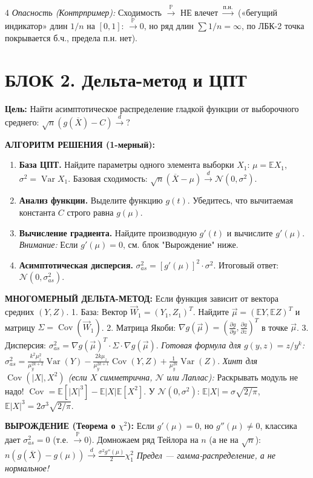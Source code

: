 \documentclass[a4paper, landscape]{article}
\newcommand{\E}{\mathbb{E}}
\renewcommand{\P}{\mathbb{P}}
\newcommand{\N}{\mathcal{N}}
\DeclareMathOperator{\Var}{Var}
\DeclareMathOperator{\Cov}{Cov}
\begin{document}
\begin{multicols*}{4}
\textit{Опасность (Контрпример):} Сходимость $\xrightarrow{\P}$ НЕ влечет $\xrightarrow{п.н.}$ («бегущий индикатор» длин $1/n$ на $[0,1]$: $\xrightarrow{\P} 0$, но ряд длин $\sum 1/n = \infty$, по ЛБК-2 точка покрывается б.ч., предела п.н. нет).

\section*{БЛОК 2. Дельта-метод и ЦПТ}
\textbf{Цель:} Найти асимптотическое распределение гладкой функции от выборочного среднего: $\sqrt{n}(g(\overline{X}) - C) \xrightarrow{d} ?$

\textbf{АЛГОРИТМ РЕШЕНИЯ (1-мерный):}
\begin{enumerate}[label=\textbf{Шаг \arabic*.}, leftmargin=*]
    \item \textbf{База ЦПТ.} Найдите параметры одного элемента выборки $X_1$: $\mu = \E X_1$, $\sigma^2 = \Var X_1$.
    Базовая сходимость: $\sqrt{n}(\overline{X} - \mu) \xrightarrow{d} \N(0, \sigma^2)$.
    \item \textbf{Анализ функции.} Выделите функцию $g(t)$. Убедитесь, что вычитаемая константа $C$ строго равна $g(\mu)$.
    \item \textbf{Вычисление градиента.} Найдите производную $g'(t)$ и вычислите $g'(\mu)$. 
    \textit{Внимание:} Если $g'(\mu) = 0$, см. блок "Вырождение" ниже.
    \item \textbf{Асимптотическая дисперсия.} $\sigma_{as}^2 = [g'(\mu)]^2 \cdot \sigma^2$. Итоговый ответ: $\N(0, \sigma_{as}^2)$.
\end{enumerate}

\textbf{МНОГОМЕРНЫЙ ДЕЛЬТА-МЕТОД:}
Если функция зависит от вектора средних $(Y, Z)$.
1. База: Вектор $\vec{W}_1 = (Y_1, Z_1)^T$. Найдите $\vec{\mu} = (\E Y, \E Z)^T$ и матрицу $\Sigma = \Cov(\vec{W}_1)$.
2. Матрица Якоби: $\nabla g(\vec{\mu}) = (\frac{\partial g}{\partial y}, \frac{\partial g}{\partial z})^T$ в точке $\vec{\mu}$.
3. Дисперсия: $\sigma_{as}^2 = \nabla g(\vec{\mu})^T \cdot \Sigma \cdot \nabla g(\vec{\mu})$.
\textit{Готовая формула для $g(y,z) = z/y^k$:} 
$\sigma^2_{as} \!=\! \frac{k^2 \mu_z^2}{\mu_y^{2k+2}} \Var(Y) - \frac{2k \mu_z}{\mu_y^{2k+1}} \Cov(Y, Z) + \frac{1}{\mu_y^{2k}} \Var(Z)$.
\textit{Хинт для $\Cov(|X|, X^2)$ (если $X$ симметрична, $\N$ или Лаплас):} Раскрывать модуль не надо! $\Cov = \E[|X|^3] - \E|X|\E[X^2]$. У $\N(0,\sigma^2)$: $\E|X|=\sigma\sqrt{2/\pi}$, $\E|X|^3=2\sigma^3\sqrt{2/\pi}$.

\textbf{ВЫРОЖДЕНИЕ (Теорема о $\chi^2$):}
Если $g'(\mu)=0$, но $g''(\mu)\ne 0$, классика дает $\sigma_{as}^2=0$ (т.е. $\xrightarrow{\P} 0$). Домножаем ряд Тейлора на $n$ (а не на $\sqrt{n}$):
$ n(g(\overline{X}) - g(\mu)) \xrightarrow{d} \frac{\sigma^2 g''(\mu)}{2} \chi^2_1 $
\textit{Предел — гамма-распределение, а не нормальное!}


\end{multicols*}
\end{document}
